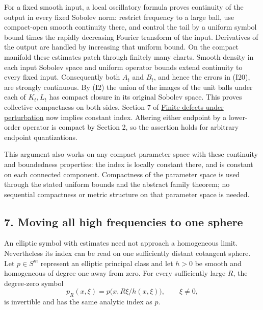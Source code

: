 \documentclass[
  11pt,
]{article}
\makeatletter
\let\ReaderOriginalAnchorStart\hyper@anchorstart
\let\ReaderOriginalAnchorEnd\hyper@anchorend
\let\ReaderPendingAliases\@empty
\def\ReaderArmAliases#1{\gdef\ReaderPendingAliases{#1}}
\def\hyper@anchorstart#1{\ReaderIfNativeAnchorTF{#1}{\ReaderPendingAliases\global\let\ReaderPendingAliases\@empty}{}\ReaderOriginalAnchorStart{#1}}
\makeatother
\begin{document}
For a fixed smooth input, a local oscillatory formula proves continuity
of the output in every fixed Sobolev norm: restrict frequency to a large
ball, use compact-open smooth continuity there, and control the tail by
a uniform symbol bound times the rapidly decreasing Fourier transform of
the input. Derivatives of the output are handled by increasing that
uniform bound. On the compact manifold these estimates patch through
finitely many charts. Smooth density in each input Sobolev space and
uniform operator bounds extend continuity to every fixed input.
Consequently both \(A_t\) and \(B_t\), and hence the errors in (I20),
are strongly continuous. By (I2) the union of the images of the unit
balls under each of \(K_t,L_t\) has compact closure in its original
Sobolev space. This proves collective compactness on both sides. Section
7 of \href{fredholm-stability.pdf}{Finite defects under perturbation} now
implies constant index. Altering either endpoint by a lower-order
operator is compact by Section 2, so the assertion holds for arbitrary
endpoint quantizations.

This argument also works on any compact parameter space with these
continuity and boundedness properties: the index is locally constant
there, and is constant on each connected component. Compactness of the
parameter space is used through the stated uniform bounds and the
abstract family theorem; no sequential compactness or metric structure
on that parameter space is needed.

\ReaderArmAliases{\ReaderOriginalAnchorStart{AN03-GSI-007}\ReaderOriginalAnchorEnd\begingroup\expandafter\def\csname @currentHref\endcsname{AN03-GSI-007}\label{AN03-GSI-007}\endgroup\ReaderOriginalAnchorStart{an03-gsi-007-moving-all-high-frequencies-to-one-sphere}\ReaderOriginalAnchorEnd\begingroup\expandafter\def\csname @currentHref\endcsname{an03-gsi-007-moving-all-high-frequencies-to-one-sphere}\label{an03-gsi-007-moving-all-high-frequencies-to-one-sphere}\endgroup\ReaderOriginalAnchorStart{7-moving-all-high-frequencies-to-one-sphere}\ReaderOriginalAnchorEnd\begingroup\expandafter\def\csname @currentHref\endcsname{7-moving-all-high-frequencies-to-one-sphere}\label{7-moving-all-high-frequencies-to-one-sphere}\endgroup}
\subsection{7. Moving all high frequencies to one
sphere}\label{moving-all-high-frequencies-to-one-sphere}

An elliptic symbol with estimates need not approach a homogeneous limit.
Nevertheless its index can be read on one sufficiently distant cotangent
sphere. Let \(p\in S^m\) represent an elliptic principal class and let
\(h>0\) be smooth and homogeneous of degree one away from zero. For
every sufficiently large \(R\), the degree-zero symbol \[
p_R(x,\xi)=p\bigl(x,R\xi/h(x,\xi)\bigr),\qquad \xi\ne0,
\tag{I21}
\] is invertible and has the same analytic index as \(p\).
\end{document}
